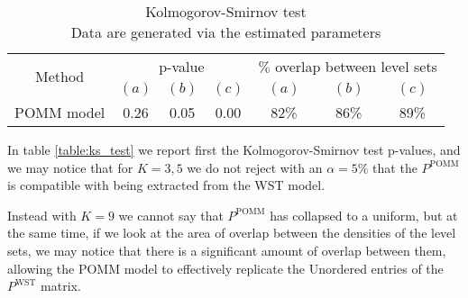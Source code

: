 \documentclass[11pt]{amsart}
\begin{document}
\begin{table}[htbp]
\centering
\caption{
{\large Kolmogorov-Smirnov test} \\ 
{\small Data are generated via the estimated parameters}
} 
\begin{tabular}{ccccccc}
\toprule
\multirow{2}{*}{Method} & \multicolumn{3}{c}{
p-value} & \multicolumn{3}{c}{
$\%$ overlap between level sets} \\
\cmidrule(lr){2-4} \cmidrule(lr){5-7}
& $(a)$ & $(b)$ & $(c)$ & $(a)$ & $(b)$ & $(c)$  \\
\midrule
POMM model  &0.26& 0.05 & 0.00 & 82\% & 86\% & 89\% \\
\bottomrule
\end{tabular}
\label{table:ks_test}
\end{table}

In table \eqref{table:ks_test} we report first the Kolmogorov-Smirnov test p-values, and we may notice that for $K=3,5$ we do not reject with an $\alpha = 5\%$ that the $P^{\text{POMM}}$ is compatible with being extracted from the WST model.

Instead with $K=9$ we cannot say that $P^{\text{POMM}}$ has collapsed to a uniform, but at the same time, if we look at the area of overlap between the densities of the level sets, we may notice that there is a significant amount of overlap between them, allowing the POMM model to effectively replicate the Unordered entries of the $P^{\text{WST}}$ matrix.
\end{document}
